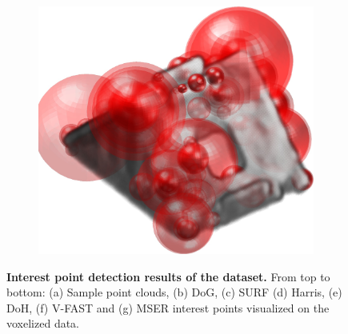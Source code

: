 \begin{figure}[ht]
\begin{subfigure}[t]{1\linewidth}
		\includegraphics[width=0.180\linewidth]{./fig/eval/bracket_mser.jpg} 
	\end{subfigure}
	\caption{\textbf{Interest point detection results of the \stereoset dataset.} From top to bottom: (a) Sample point clouds, (b) DoG, (c) SURF (d) Harris, (e) DoH, (f) V-FAST and (g) MSER interest points visualized on the voxelized data.}
	\label{fig/eval/mvs}
\end{figure}

